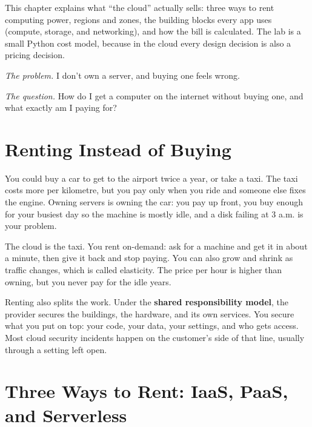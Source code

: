 
\begin{chapterintro}

This chapter explains what ``the cloud'' actually sells: three ways to rent computing power, regions and zones, the building blocks every app uses (compute, storage, and networking), and how the bill is calculated. The lab is a small Python cost model, because in the cloud every design decision is also a pricing decision.

\end{chapterintro}

\emph{The problem.} I don't own a server, and buying one feels wrong.

\emph{The question.} How do I get a computer on the internet without buying one, and what exactly am I paying for?

\section{Renting Instead of Buying}\label{03-the-cloud-renting-computers-by-the-minute:renting-instead-of-buying}

You could buy a car to get to the airport twice a year, or take a taxi. The taxi costs more per kilometre, but you pay only when you ride and someone else fixes the engine. Owning servers is owning the car: you pay up front, you buy enough for your busiest day so the machine is mostly idle, and a disk failing at 3 a.m. is your problem.

The cloud is the taxi. You rent on-demand: ask for a machine and get it in about a minute, then give it back and stop paying. You can also grow and shrink as traffic changes, which is called elasticity. The price per hour is higher than owning, but you never pay for the idle years.

Renting also splits the work. Under the \textbf{shared responsibility model}, the provider secures the buildings, the hardware, and its own services. You secure what you put on top: your code, your data, your settings, and who gets access. Most cloud security incidents happen on the customer's side of that line, usually through a setting left open.


\section{Three Ways to Rent: IaaS, PaaS, and Serverless}\label{03-the-cloud-renting-computers-by-the-minute:three-ways-to-rent-iaas-paas-and-serverless}

